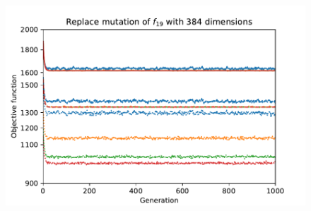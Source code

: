 \begin{figure}[ht!]
\begin{minipage}[t]{0.32\textwidth}
    \end{minipage}
    \hfill
    \begin{minipage}[t]{0.32\textwidth}
        \centering
        \includegraphics[width=\textwidth]{img/runs/fitness_es_mutation_f19_dim384_ReplaceUniform.pdf}
    \end{minipage}


\end{figure}
